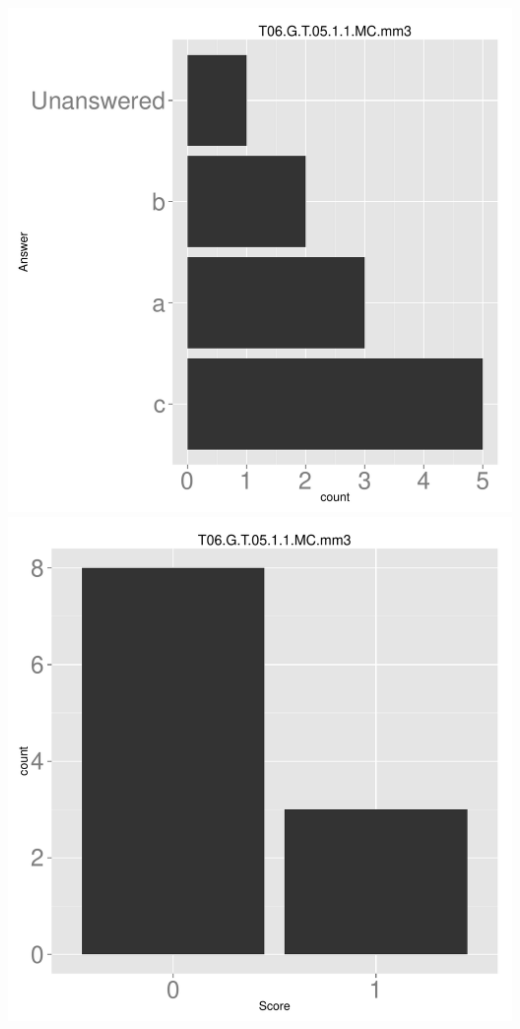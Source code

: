 \documentclass[12pt,english,nohyper]{tufte-handout}\usepackage[]{graphicx}\usepackage[]{color}
\begin{document}
\begin{center} \includegraphics[width=.45\linewidth]{Topic06_AB_80_answer} \includegraphics[width=.45\linewidth]{Topic06_AB_80_score} \end{center} 
\end{document}
